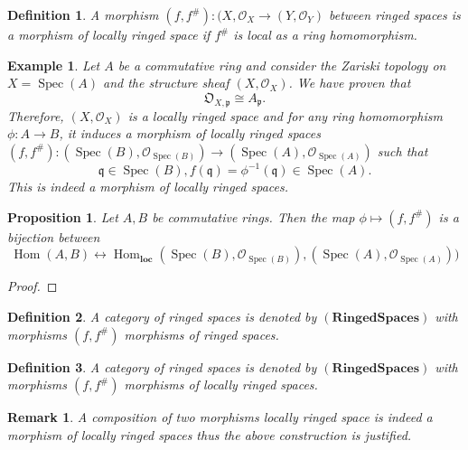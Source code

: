 \documentclass{article}
\newtheorem{proposition}{Proposition}[section]
\newtheorem{definition}{Definition}[section]
\newtheorem{remark}{Remark}[section]
\newtheorem{example}{Example}[section]
\numberwithin{equation}{section}
\DeclareMathOperator{\Hom}{Hom}
\DeclareMathOperator{\Spec}{Spec}
\begin{document}
\begin{definition}
A morphism $(f,f^{\#}):(X,\mathcal{O}_X\to(Y,\mathcal{O}_Y)$ between ringed spaces is a morphism of locally ringed space if $f^{\#}$ is local as a ring homomorphism. 
\end{definition}

\begin{example}
Let $A$ be a commutative ring and consider the Zariski topology on $X=\Spec(A)$ and the structure sheaf $(X,\mathcal{O}_X)$. We have proven that 
\begin{equation*}
\mathfrak{O}_{X,\mathfrak{p}}\cong A_{\mathfrak{p}}.
\end{equation*}
Therefore, $(X,\mathcal{O}_X)$ is a locally ringed space and for any ring homomorphism $\phi:A\to B$, it induces a morphism of locally ringed spaces $(f,f^{\#}):(\Spec(B),\mathcal{O}_{\Spec(B)})\to(\Spec(A),\mathcal{O}_{\Spec(A)})$ such that
\begin{equation*}
\mathfrak{q}\in\Spec(B), f(\mathfrak{q}) = \phi^{-1}(\mathfrak{q})\in\Spec(A).
\end{equation*}
This is indeed a morphism of locally ringed spaces. 
\end{example}

\begin{proposition}
Let $A,B$ be commutative rings. Then the map $\phi\mapsto(f,f^{\#})$ is a bijection between
\begin{equation*}
\Hom(A,B)\leftrightarrow \Hom_{\mathbf{loc}}(\Spec(B),\mathcal{O}_{\Spec(B)}),(\Spec(A),\mathcal{O}_{\Spec(A)}))
\end{equation*}
\end{proposition}

\begin{proof}
\end{proof}

\begin{definition}
A category of ringed spaces is denoted by $(\mathbf{Ringed Spaces})$ with morphisms $(f,f^{\#})$ morphisms of ringed spaces. 
\end{definition}

\begin{definition}
A category of ringed spaces is denoted by $(\mathbf{Ringed Spaces})$ with morphisms $(f,f^{\#})$ morphisms of locally ringed spaces. 
\end{definition}

\begin{remark}
A composition of two morphisms locally ringed space is indeed a morphism of locally ringed spaces thus the above construction is justified.%
\end{remark}
\end{document}
